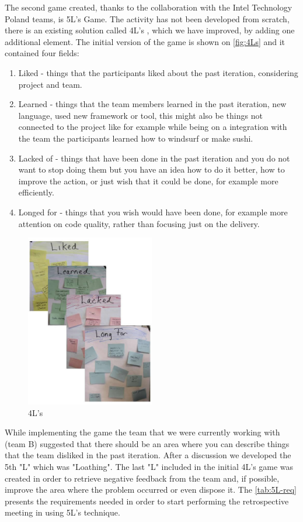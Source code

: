 The second game created, thanks to the collaboration with the Intel Technology Poland teams, is 5L's Game. The activity has not been developed from scratch, there is an existing solution called 4L's \cite{4Ls}, which we have improved, by adding one additional element. The initial version of the game is shown on \autoref{fig:4Ls} and it contained four fields:
\begin{enumerate}
    \item Liked - things that the participants liked about the past iteration, considering project and team.
    \item Learned - things that the team members learned in the past iteration, new language, used new framework or tool, this might also be things not connected to the project like for example while being on a integration with the team the participants learned how to windsurf or make sushi.
    \item Lacked of - things that have been done in the past iteration and you do not want to stop doing them but you have an idea how to do it better, how to improve the action, or just wish that it could be done, for example more efficiently.
    \item Longed for - things that you wish would have been done, for example more attention on code quality, rather than focusing just on the delivery.
\end{enumerate}

\begin{figure}[h]
\caption{4L's} 
\label{fig:4Ls}
\centering
\includegraphics[width=0.5\textwidth]{img/4L}
\end{figure}

While implementing the game the team that we were currently working with (team B) suggested that there should be an area where you can describe things that the team disliked in the past iteration. After a discussion we developed the 5th "L" which was "Loathing". The last "L" included in the initial 4L's game was created in order to retrieve negative feedback from the team and, if possible, improve the area where the problem occurred or even dispose it. The \autoref{tab:5L-req} presents the requirements needed in order to start performing the retrospective meeting in using 5L's technique.

